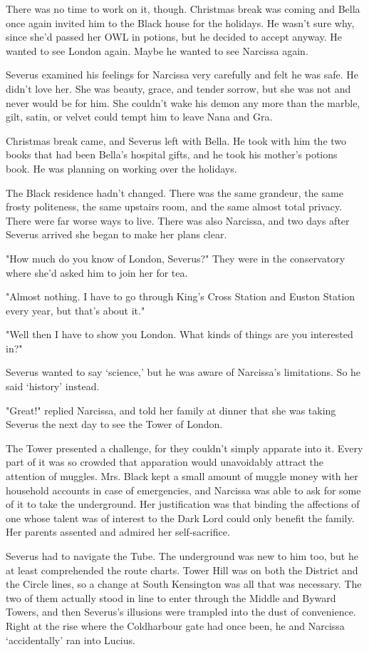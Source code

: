 \documentclass[a4paper,11pt]{article}
\begin{document}
There was no time to work on it, though. Christmas break was coming and Bella once again invited him to the Black house for the holidays. He wasn't sure why, since she'd passed her OWL in potions, but he decided to accept anyway. He wanted to see London again. Maybe he wanted to see Narcissa again.

Severus examined his feelings for Narcissa very carefully and felt he was safe. He didn't love her. She was beauty, grace, and tender sorrow, but she was not and never would be for him. She couldn't wake his demon any more than the marble, gilt, satin, or velvet could tempt him to leave Nana and Gra.

Christmas break came, and Severus left with Bella. He took with him the two books that had been Bella's hospital gifts, and he took his mother's potions book. He was planning on working over the holidays.

The Black residence hadn't changed. There was the same grandeur, the same frosty politeness, the same upstairs room, and the same almost total privacy. There were far worse ways to live. There was also Narcissa, and two days after Severus arrived she began to make her plans clear.

"How much do you know of London, Severus?" They were in the conservatory where she'd asked him to join her for tea.

"Almost nothing. I have to go through King's Cross Station and Euston Station every year, but that's about it."

"Well then I have to show you London. What kinds of things are you interested in?"

Severus wanted to say `science,' but he was aware of Narcissa's limitations. So he said `history' instead.

"Great!" replied Narcissa, and told her family at dinner that she was taking Severus the next day to see the Tower of London.

The Tower presented a challenge, for they couldn't simply apparate into it. Every part of it was so crowded that apparation would unavoidably attract the attention of muggles. Mrs. Black kept a small amount of muggle money with her household accounts in case of emergencies, and Narcissa was able to ask for some of it to take the underground. Her justification was that binding the affections of one whose talent was of interest to the Dark Lord could only benefit the family. Her parents assented and admired her self-sacrifice.

Severus had to navigate the Tube. The underground was new to him too, but he at least comprehended the route charts. Tower Hill was on both the District and the Circle lines, so a change at South Kensington was all that was necessary. The two of them actually stood in line to enter through the Middle and Byward Towers, and then Severus's illusions were trampled into the dust of convenience. Right at the rise where the Coldharbour gate had once been, he and Narcissa `accidentally' ran into Lucius.
\end{document}
